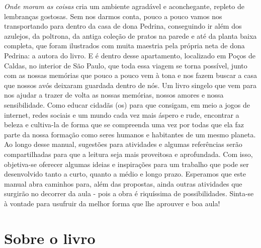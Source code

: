 \documentclass[11pt]{extarticle}
\begin{document}
\textit{Onde moram as coisas} cria um ambiente agradável e aconchegante, repleto de lembranças gostosas. Sem nos darmos conta, pouco a pouco vamos nos transportando para dentro da casa de dona Pedrina, conseguindo ir além dos azulejos, da poltrona, da antiga coleção de pratos na parede e até da planta baixa completa, que foram ilustrados com muita maestria pela própria neta de dona Pedrina: a autora do livro. E é dentro desse apartamento, localizado em Poços de Caldas, no interior de São Paulo, que toda essa viagem se torna possível, junto com as nossas memórias que pouco a pouco vem à tona e nos fazem buscar a casa que nossos avós deixaram guardada dentro de nós. Um livro singelo que vem para nos ajudar a trazer de volta as nossas memórias, nossos amores e nossa sensibilidade. Como educar cidadãs (os) para que consigam, em meio a jogos de internet, redes sociais e um mundo cada vez mais áspero e rude, encontrar a beleza e cultiva-la de forma que se compreenda uma vez por todas que ela faz parte da nossa formação como seres humanos e habitantes de um mesmo planeta. Ao longo desse manual, sugestões para atividades e algumas referências serão compartilhadas para que a leitura seja mais proveitosa e aprofundada. Com isso, objetiva-se oferecer algumas ideias e inspirações para um trabalho que pode ser desenvolvido tanto a curto, quanto a médio e longo prazo. Esperamos que este manual abra caminhos para, além das propostas, ainda outras atividades que surgirão no decorrer da aula - pois a obra é riquíssima de possibilidades. Sinta-se à vontade para usufruir da melhor forma que lhe aprouver e boa aula!

\section{Sobre o livro}
\end{document}
